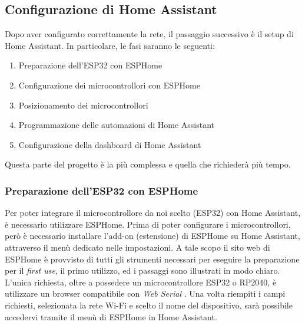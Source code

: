 \documentclass[11pt, a4paper]{article}
\begin{document}
\newcommand{\primaFaseHA}{Preparazione dell'ESP32 con ESPHome}
\newcommand{\secondaFaseHA}{Configurazione dei microcontrollori con ESPHome}
\newcommand{\terzaFaseHA}{Posizionamento dei microcontrollori}
\newcommand{\quartaFaseHA}{Programmazione delle automazioni di Home Assistant}
\newcommand{\quintaFaseHA}{Configurazione della dashboard di Home Assistant}

\subsection{Configurazione di Home Assistant}
Dopo aver configurato correttamente la rete, il passaggio successivo è il setup di
Home Assistant. In particolare, le fasi saranno le seguenti:
\begin{enumerate}
    \item \primaFaseHA
    \item \secondaFaseHA
    \item \terzaFaseHA
    \item \quartaFaseHA
    \item \quintaFaseHA
\end{enumerate}
Questa parte del progetto è la più complessa e quella che richiederà più tempo.

\subsubsection{\primaFaseHA}
Per poter integrare il microcontrollore da noi scelto (ESP32) con Home Assistant,
è necessario utilizzare ESPHome.
Prima di poter configurare i microcontrollori, però è necessario installare l'add-on
(estensione)
di ESPHome su Home Assistant, attraverso il menù dedicato nelle impostazioni.
A tale scopo il sito web di ESPHome è provvisto di tutti gli strumenti necessari per
eseguire la preparazione per il \textit{first use}, il primo utilizzo, 
ed i passaggi sono illustrati in modo chiaro.
L'unica richiesta, oltre a possedere un microcontrollore ESP32 o RP2040, è utilizzare
un browser compatibile con \textit{Web Serial} .
Una volta riempiti i campi richiesti, selezionata la rete Wi-Fi e scelto il nome del
dispositivo, sarà possibile accedervi tramite il menù di ESPHome in Home Assistant.
\end{document}
